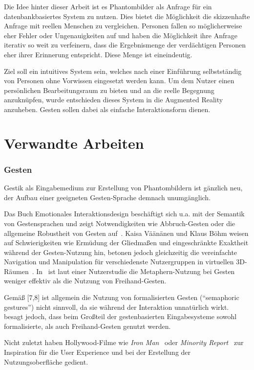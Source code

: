 \documentclass{sigchi-ext}
\begin{document}
Die Idee hinter dieser Arbeit ist es Phantombilder als Anfrage für ein datenbankbasiertes System zu nutzen. Dies bietet die Möglichkeit die skizzenhafte Anfrage mit reellen Menschen zu vergleichen. Personen fallen so möglicherweise eher Fehler oder Ungenauigkeiten auf und haben die Möglichkeit ihre Anfrage iterativ so weit zu verfeinern, dass die Ergebnismenge der verdächtigen Personen eher ihrer Erinnerung entspricht. Diese Menge ist eineindeutig.

Ziel soll ein intuitives System sein, welches nach einer Einführung selbstständig von Personen ohne Vorwissen eingesetzt werden kann. Um dem Nutzer einen persönlichen Bearbeitungsraum zu bieten und an die reelle Begegnung anzuknüpfen, wurde entschieden dieses System in die Augmented Reality anzuheben. Gesten sollen dabei als einfache Interaktionsform dienen.

\section{Verwandte Arbeiten}
\subsubsection{Gesten}
Gestik als Eingabemedium zur Erstellung von Phantombildern ist gänzlich neu, der Aufbau einer geeigneten Gesten-Sprache demnach unumgänglich. 

Das Buch Emotionales Interaktionsdesign beschäftigt sich
 u.a. mit der Semantik von Gestensprachen und zeigt Notwendigkeiten wie Abbruch-Gesten oder die allgemeine Robustheit von Gesten auf~\cite{Dorau11}. Kaisa Väänänen und Klaus Böhm weisen auf Schwierigkeiten wie Ermüdung der Gliedma{\ss}en und eingeschränkte Exaktheit während der Gesten-Nutzung hin, betonen jedoch gleichzeitig die vereinfachte Navigation und Manipulation für verschiedenste Nutzergruppen in virtuellen 3D-Räumen~\cite{vrs:book}.
In~\cite{3dinteraction:book} ist laut einer Nutzerstudie die
Metaphern-Nutzung bei Gesten weniger effektiv als die Nutzung von
Freihand-Gesten. 

Gemä{\ss} [7,8] ist allgemein die Nutzung von formalisierten Gesten (``semaphoric gestures'') nicht sinnvoll, da sie während der Interaktion unnatürlich wirkt.
~\cite{3dinteraction:book} besagt jedoch, dass beim Gro{\ss}teil der
gestenbasierten Eingabesysteme sowohl formalisierte, als auch
Freihand-Gesten genutzt werden.

Nicht zuletzt haben Hollywood-Filme wie \textit{Iron Man}~\cite{ironman:movie} oder \textit{Minority Report}~\cite{minorityreport:movie} zur Inspiration für die User Experience und bei der Erstellung der Nutzungsoberfläche gedient.
\end{document}
